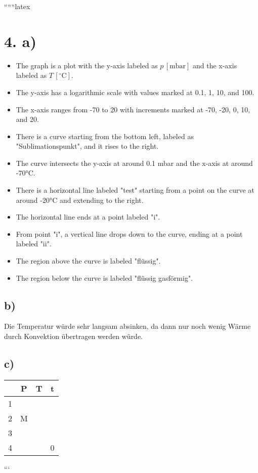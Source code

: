 
``````latex


\section*{4. a)}

\begin{itemize}
    \item The graph is a plot with the y-axis labeled as \( p \, [\text{mbar}] \) and the x-axis labeled as \( T \, [^\circ \text{C}] \).
    \item The y-axis has a logarithmic scale with values marked at 0.1, 1, 10, and 100.
    \item The x-axis ranges from -70 to 20 with increments marked at -70, -20, 0, 10, and 20.
    \item There is a curve starting from the bottom left, labeled as "Sublimationspunkt", and it rises to the right.
    \item The curve intersects the y-axis at around 0.1 mbar and the x-axis at around -70°C.
    \item There is a horizontal line labeled "test" starting from a point on the curve at around -20°C and extending to the right.
    \item The horizontal line ends at a point labeled "i".
    \item From point "i", a vertical line drops down to the curve, ending at a point labeled "ii".
    \item The region above the curve is labeled "flüssig".
    \item The region below the curve is labeled "flüssig gasförmig".
\end{itemize}

\subsection*{b)}
Die Temperatur würde sehr langsam absinken, da dann nur noch wenig Wärme durch Konvektion übertragen werden würde.

\subsection*{c)}
\begin{tabular}{|c|c|c|c|}
    \hline
    & P & T & t \\
    \hline
    1 & & & \\
    \hline
    2 & M & & \\
    \hline
    3 & & & \\
    \hline
    4 & & & 0 \\
    \hline
\end{tabular}

```